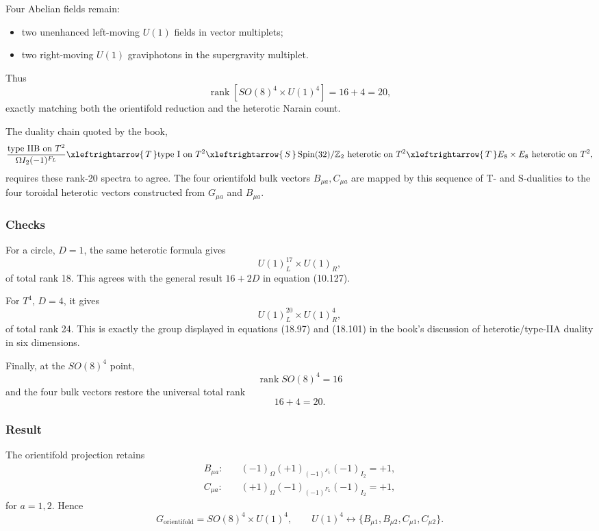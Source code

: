 \documentclass[
  10pt,
  a4paper,
  openany]{book}
\providecommand{\tightlist}{%
  \setlength{\itemsep}{0pt}\setlength{\parskip}{0pt}}
\begin{document}
Four Abelian fields remain:

\begin{itemize}
\tightlist
\item
  two unenhanced left-moving \(U(1)\) fields in vector multiplets;
\item
  two right-moving \(U(1)\) graviphotons in the supergravity multiplet.
\end{itemize}

Thus \[
\operatorname{rank}
\left[
SO(8)^4\times U(1)^4
\right]
=16+4
=20,
\] exactly matching both the orientifold reduction and the heterotic
Narain count.

The duality chain quoted by the book, \[
\frac{\text{type IIB on }T^2}
{\Omega I_2(-1)^{F_L}}
\xleftrightarrow{\,T\,}
\text{type I on }T^2
\xleftrightarrow{\,S\,}
\operatorname{Spin}(32)/\mathbb Z_2
\text{ heterotic on }T^2
\xleftrightarrow{\,T\,}
E_8\times E_8
\text{ heterotic on }T^2,
\] requires these rank-20 spectra to agree. The four orientifold bulk
vectors \(B_{\mu a},C_{\mu a}\) are mapped by this sequence of T- and
S-dualities to the four toroidal heterotic vectors constructed from
\(G_{\mu a}\) and \(B_{\mu a}\).

\subsubsection{Checks}\label{checks-35}

For a circle, \(D=1\), the same heterotic formula gives \[
U(1)^{17}_L\times U(1)_R,
\] of total rank 18. This agrees with the general result \(16+2D\) in
equation (10.127).

For \(T^4\), \(D=4\), it gives \[
U(1)^{20}_L\times U(1)^4_R,
\] of total rank 24. This is exactly the group displayed in equations
(18.97) and (18.101) in the book's discussion of heterotic/type-IIA
duality in six dimensions.

Finally, at the \(SO(8)^4\) point, \[
\operatorname{rank}SO(8)^4=16
\] and the four bulk vectors restore the universal total rank \[
16+4=20.
\]

\subsubsection{Result}\label{result-43}

The orientifold projection retains \[
\begin{aligned}
B_{\mu a}:&\quad
(-1)_\Omega(+1)_{(-1)^{F_L}}(-1)_{I_2}=+1,\\
C_{\mu a}:&\quad
(+1)_\Omega(-1)_{(-1)^{F_L}}(-1)_{I_2}=+1,
\end{aligned}
\] for \(a=1,2\). Hence \[
\boxed{
G_{\mathrm{orientifold}}
=SO(8)^4\times U(1)^4,
\qquad
U(1)^4
\leftrightarrow
\{B_{\mu1},B_{\mu2},C_{\mu1},C_{\mu2}\}
}.
\]
\end{document}
